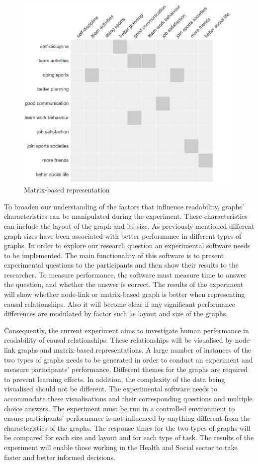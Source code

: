 \documentclass{l4proj}
\begin{document}
\begin{figure}[H]
\centering
\includegraphics[width=11cm]{images/gymSmallAlpha.PNG}
\caption{Matrix-based representation}
\label{gymSmallAlphaintro}
\end{figure}
 
To broaden our understanding of the factors that influence readability, graphs' characteristics can be manipulated during the experiment. These characteristics can include the layout of the graph and its size. As previously mentioned different graph sizes have been associated with better performance in different types of graphs. In order to explore our research question an experimental software needs to be implemented. The main functionality of this software  is to present experimental questions to the participants and then show their results to the researcher. To measure performance, the software must measure time to answer the question, and whether the answer is correct. The results of the experiment will show whether node-link or matrix-based graph is better when representing causal relationships. Also it will become clear if any significant performance differences are modulated by factor such as layout and size of the graphs. 

Consequently, the current experiment aims to investigate human performance in readability of causal relationships. These relationships will be visualised by node-link graphs and matrix-based representations. A large number of instances of the two types of graphs needs to be generated in order to conduct an experiment and measure participants' performance. Different themes for the graphs are required to prevent learning effects. In addition, the complexity of the data being visualised should not be different. The experimental software needs to accommodate these visualisations and their corresponding questions and multiple choice answers. The experiment must be run in a controlled environment to ensure participants' performance is not influenced by anything different from the characteristics of the graphs. The response times for the two types of graphs will be compared for each size and layout and for each type of task. The results of the experiment will enable those working in the Health and Social sector to take faster and better informed decisions. 
\end{document}

